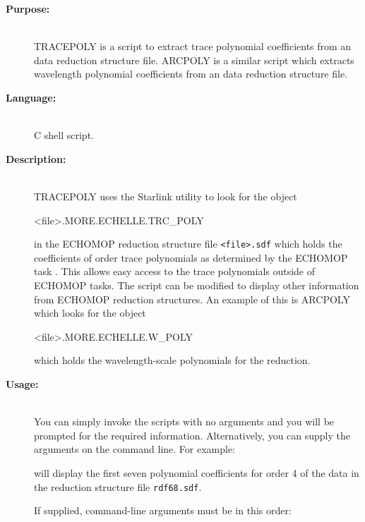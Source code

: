 \documentclass[twoside,11pt]{starlink}
\begin{document}
\begin{description}

\item [\textbf{Purpose:}] \mbox{} \\
     TRACEPOLY is a script to extract trace polynomial coefficients from an
      data reduction structure file.
     ARCPOLY is a similar script which extracts wavelength polynomial
     coefficients from an  data reduction structure
     file.

\item [\textbf{Language:}] \mbox{} \\
     C shell script.

\item [\textbf{Description:}] \mbox{} \\
     TRACEPOLY uses the Starlink  utility to
     look for the object
\begin{terminalv}
   <file>.MORE.ECHELLE.TRC_POLY
\end{terminalv}
     in the ECHOMOP reduction structure file \verb+<file>.sdf+ which holds
     the coefficients of order trace polynomials as determined by
     the ECHOMOP task .
     This allows easy access to
     the trace polynomials outside of ECHOMOP tasks.  The script
     can be modified to display other information from ECHOMOP
     reduction structures.  An example of this is ARCPOLY which looks
     for the object
\begin{terminalv}
   <file>.MORE.ECHELLE.W_POLY
\end{terminalv}
     which holds the wavelength-scale polynomials for the reduction.

\item [\textbf{Usage:}] \mbox{} \\
     You can simply invoke the scripts with no arguments and you
     will be prompted for the required information.  Alternatively,
     you can supply the arguments on the command line.  For example:

\begin{terminalv}
\end{terminalv}

     will display the first seven polynomial coefficients for order 4
     of the data in the reduction structure file \verb+rdf68.sdf+.

     If supplied, command-line arguments must be in this order:


\end{description}
\end{document}
